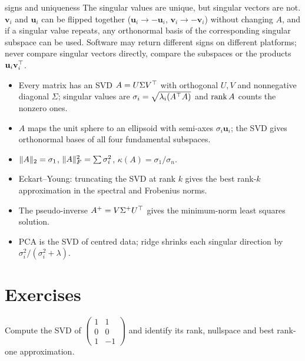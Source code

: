 \begin{nuance}{signs and uniqueness}
The singular values are unique, but singular vectors are not. $\mathbf{v}_i$ and $\mathbf{u}_i$ can be flipped together ($\mathbf{u}_i\to-\mathbf{u}_i$, $\mathbf{v}_i\to-\mathbf{v}_i$) without changing $A$, and if a singular value repeats, any orthonormal basis of the corresponding singular subspace can be used. Software may return different signs on different platforms; never compare singular vectors directly, compare the subspaces or the products $\mathbf{u}_i\mathbf{v}_i^{\top}$.
\end{nuance}

\begin{summarybox}
\begin{itemize}
  \item Every matrix has an SVD $A=U\Sigma V^{\top}$ with orthogonal $U,V$ and nonnegative diagonal $\Sigma$; singular values are $\sigma_i=\sqrt{\lambda_i(A^{\top} A)}$ and $\operatorname{rank} A$ counts the nonzero ones.
  \item $A$ maps the unit sphere to an ellipsoid with semi-axes $\sigma_i\mathbf{u}_i$; the SVD gives orthonormal bases of all four fundamental subspaces.
  \item $\lVert A\rVert_2=\sigma_1$, $\lVert A\rVert_F^2=\sum\sigma_i^2$, $\kappa(A)=\sigma_1/\sigma_n$.
  \item Eckart--Young: truncating the SVD at rank $k$ gives the best rank-$k$ approximation in the spectral and Frobenius norms.
  \item The pseudo-inverse $A^+=V\Sigma^+U^{\top}$ gives the minimum-norm least squares solution.
  \item PCA is the SVD of centred data; ridge shrinks each singular direction by $\sigma_i^2/(\sigma_i^2+\lambda)$.
\end{itemize}
\end{summarybox}

\section{Exercises}

\begin{exercise}
Compute the SVD of $\begin{pmatrix}1&1\\0&0\\1&-1\end{pmatrix}$ and identify its rank, nullspace and best rank-one approximation.
\end{exercise}

